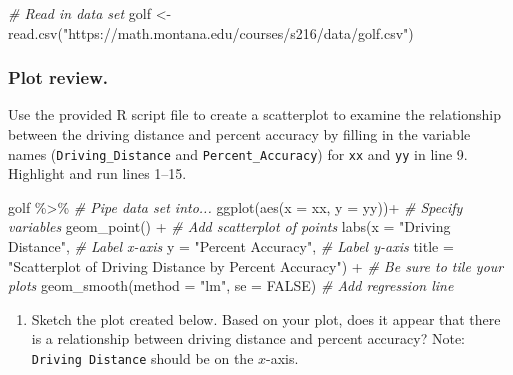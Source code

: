 \documentclass[
]{report}
\newenvironment{Shaded}{\begin{snugshade}}{\end{snugshade}}
\newcommand{\AttributeTok}[1]{\textcolor[rgb]{0.77,0.63,0.00}{#1}}
\newcommand{\CommentTok}[1]{\textcolor[rgb]{0.56,0.35,0.01}{\textit{#1}}}
\newcommand{\ConstantTok}[1]{\textcolor[rgb]{0.00,0.00,0.00}{#1}}
\newcommand{\FunctionTok}[1]{\textcolor[rgb]{0.00,0.00,0.00}{#1}}
\newcommand{\NormalTok}[1]{#1}
\newcommand{\OtherTok}[1]{\textcolor[rgb]{0.56,0.35,0.01}{#1}}
\newcommand{\SpecialCharTok}[1]{\textcolor[rgb]{0.00,0.00,0.00}{#1}}
\newcommand{\StringTok}[1]{\textcolor[rgb]{0.31,0.60,0.02}{#1}}
\providecommand{\tightlist}{%
  \setlength{\itemsep}{0pt}\setlength{\parskip}{0pt}}
\begin{document}
\begin{Shaded}
\begin{Highlighting}[]
\CommentTok{\# Read in data set}
\NormalTok{golf }\OtherTok{\textless{}{-}} \FunctionTok{read.csv}\NormalTok{(}\StringTok{"https://math.montana.edu/courses/s216/data/golf.csv"}\NormalTok{)}
\end{Highlighting}
\end{Shaded}

\hypertarget{plot-review.}{%
\subsubsection*{Plot review.}\label{plot-review.}}

Use the provided R script file to create a scatterplot to examine the relationship between the driving distance and percent accuracy by filling in the variable names (\texttt{Driving\_Distance} and \texttt{Percent\_Accuracy}) for \texttt{xx} and \texttt{yy} in line 9. Highlight and run lines 1--15.

\begin{Shaded}
\begin{Highlighting}[]
\NormalTok{golf }\SpecialCharTok{\%\textgreater{}\%} \CommentTok{\# Pipe data set into...}
\FunctionTok{ggplot}\NormalTok{(}\FunctionTok{aes}\NormalTok{(}\AttributeTok{x =}\NormalTok{ xx, }\AttributeTok{y =}\NormalTok{ yy))}\SpecialCharTok{+}  \CommentTok{\# Specify variables}
  \FunctionTok{geom\_point}\NormalTok{() }\SpecialCharTok{+}  \CommentTok{\# Add scatterplot of points}
  \FunctionTok{labs}\NormalTok{(}\AttributeTok{x =} \StringTok{"Driving Distance"}\NormalTok{,  }\CommentTok{\# Label x{-}axis}
       \AttributeTok{y =} \StringTok{"Percent Accuracy"}\NormalTok{,  }\CommentTok{\# Label y{-}axis}
       \AttributeTok{title =} \StringTok{"Scatterplot of Driving Distance by Percent Accuracy"}\NormalTok{) }\SpecialCharTok{+} 
               \CommentTok{\# Be sure to tile your plots}
  \FunctionTok{geom\_smooth}\NormalTok{(}\AttributeTok{method =} \StringTok{"lm"}\NormalTok{, }\AttributeTok{se =} \ConstantTok{FALSE}\NormalTok{)  }\CommentTok{\# Add regression line}
\end{Highlighting}
\end{Shaded}

\begin{enumerate}
\def\labelenumi{\arabic{enumi}.}
\tightlist
\item
  Sketch the plot created below. Based on your plot, does it appear that there is a relationship between driving distance and percent accuracy? Note: \texttt{Driving\ Distance} should be on the \(x\)-axis.
\end{enumerate}
\end{document}
